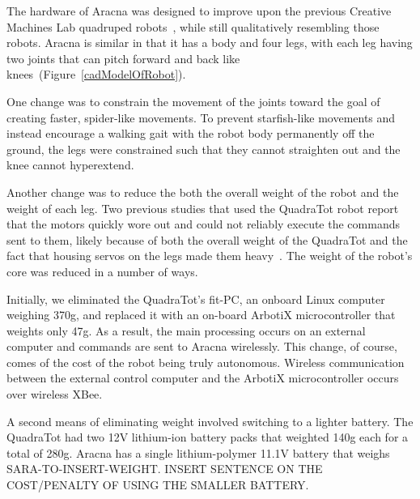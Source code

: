 \documentclass[letterpaper]{article}
\begin{document}

The hardware of Aracna was designed to improve upon the previous Creative Machines Lab
quadruped robots~\citep{bongard2006resilient, yosinski2011gaits}, while still qualitatively resembling those robots. Aracna is similar in that it has a body and four legs, with each leg having two joints that can pitch forward and back like knees~(Figure~\ref{cadModelOfRobot}). 

One change was to constrain the movement of the
joints toward the goal of creating faster, spider-like movements. To
prevent starfish-like movements and instead encourage a walking gait with the robot body permanently off the ground, the legs were constrained such that they cannot straighten out and the knee cannot hyperextend. 

Another change was to reduce the both the overall weight of the robot and the weight of each leg. Two previous studies that used the QuadraTot robot report that the motors quickly wore out and could not reliably execute the commands sent to them, likely because of both the overall weight of the QuadraTot and the fact that housing servos on the legs made them heavy~\citep{bongard2006resilient, yosinski2011gaits}. The weight of the robot's core was reduced in a number of ways. 

Initially, we eliminated the QuadraTot's fit-PC, an onboard Linux computer weighing 370g, and replaced it with an on-board ArbotiX microcontroller that weights only 47g. As a result, the main processing occurs on an external computer and commands are sent to Aracna wirelessly. This change, of course, comes of the cost of the robot being truly autonomous. Wireless communication between the external control computer
and the ArbotiX  microcontroller occurs over wireless XBee.

A second means of eliminating weight involved switching to a lighter battery. The QuadraTot had two 12V lithium-ion battery packs that weighted 140g each for a total of 280g. Aracna has a single lithium-polymer 11.1V battery that weighs SARA-TO-INSERT-WEIGHT. INSERT SENTENCE ON THE COST/PENALTY OF USING THE SMALLER BATTERY.   
\end{document}
